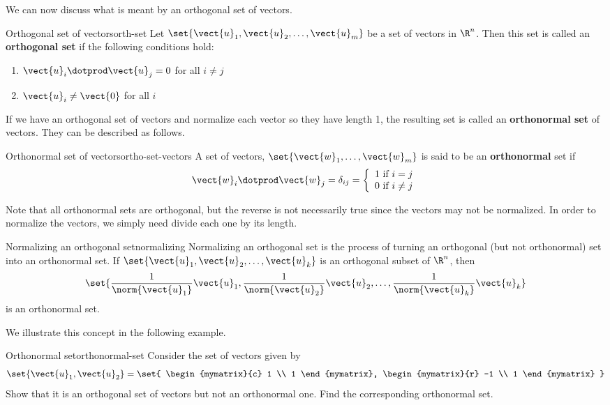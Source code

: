 We can now discuss what is meant by an orthogonal set of vectors.

\begin{definition}{Orthogonal set of vectors}{orth-set}
Let $\set{\vect{u}_1, \vect{u}_2,\ldots, \vect{u}_m}$ be a set of
vectors in $\R^n$. Then this set is called an
\textbf{orthogonal set}
if the following conditions hold:
\begin{enumerate}
\item
$\vect{u}_i \dotprod \vect{u}_j = 0$ for all $i \neq j$
\item
$\vect{u}_i \neq \vect{0}$ for all $i$
\end{enumerate}
\end{definition}

If we have an orthogonal set of vectors and normalize each vector so
they have length 1, the resulting set is called an \textbf{orthonormal
set} of vectors. They can be described as follows.

\begin{definition}{Orthonormal set of vectors}{ortho-set-vectors}
A set of vectors, $\set{\vect{w}_{1},\ldots,\vect{w}_{m}} $
is said to be an
\textbf{orthonormal}
set if
\[
\vect{w}_i \dotprod \vect{w}_j = \delta _{ij} = \left\{
\begin{array}{c}
1\text{ if }i=j \\
0\text{ if }i\neq j
\end{array}
\right.
\]
\end{definition}

Note that all orthonormal sets are orthogonal, but the reverse is not
necessarily true since the vectors may not be normalized. In order to
normalize the vectors, we simply need divide each one by its length.

\begin{definition}{Normalizing an orthogonal set}{normalizing}
Normalizing an orthogonal set is the process of
turning an orthogonal (but not orthonormal) set into
an orthonormal set.
If $\set{\vect{u}_1, \vect{u}_2, \ldots, \vect{u}_k}$
is an orthogonal subset of $\R^n$,
then
\[ \set{
\frac{1}{\norm{\vect{u}_1}}\vect{u}_1,
\frac{1}{\norm{\vect{u}_2}}\vect{u}_2, \ldots,
\frac{1}{\norm{\vect{u}_k}}\vect{u}_k }
\]
is an orthonormal set.
\end{definition}

We illustrate this concept in the following example.

\begin{example}{Orthonormal set}{orthonormal-set}
Consider the set of vectors  given by
\[
\set{\vect{u}_1, \vect{u}_2 } = \set{
\begin{mymatrix}{c}
1 \\
1
\end{mymatrix},
\begin{mymatrix}{r}
-1 \\
1
\end{mymatrix}
}
\]
Show that it is an orthogonal set of vectors  but not an orthonormal one. Find the corresponding orthonormal set.
\end{example}

